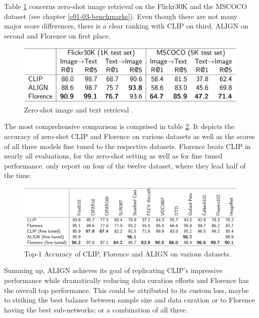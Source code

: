 \documentclass[
]{krantz}
\begin{document}
Table \ref{fig:table2} concerns zero-shot image retrieval on the Flickr30K and the MSCOCO dataset (see chapter \ref{c01-03-benchmarks}).
Even though there are not many major score differences, there is a clear ranking with CLIP on third, ALIGN on second and Florence on first place.

\begin{figure}

{\centering \includegraphics[width=1\linewidth]{figures/02-04-text-support-img/table-img-txt-retrieval} 

}

\caption{Zero-shot image and text retrieval \citep{yuan2021florence}.}\label{fig:table2}
\end{figure}



The most comprehensive comparison is comprised in table \ref{fig:table3}.
It depicts the accuracy of zero-shot CLIP and Florence on various datasets as well as the scores of all three models fine tuned to the respective datasets.
Florence beats CLIP in nearly all evaluations, for the zero-shot setting as well as for fine tuned performance.
\citet{jia2021scaling} only report on four of the twelve dataset, where they lead half of the time.

\begin{figure}

{\centering \includegraphics[width=1\linewidth]{figures/02-04-text-support-img/table-misc-datasets} 

}

\caption{Top-1 Accuracy of CLIP, Florence and ALIGN on various datasets.}\label{fig:table3}
\end{figure}



Summing up, ALIGN achieves its goal of replicating CLIP's impressive performance while dramatically reducing data curation efforts and Florence has the overall top performance.
This could be attributed to its custom loss, maybe to \citet{yuan2021florence} striking the best balance between sample size and data curation or to Florence having the best sub-networks; or a combination of all three.
\end{document}
